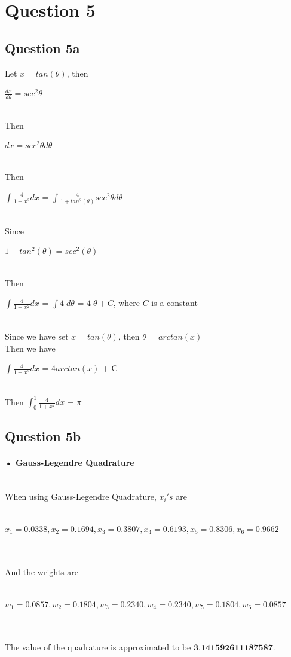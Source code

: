 \documentclass[11pt]{article} %
\begin{document}
\section{Question 5}
\subsection{Question 5a}
Let $x = tan(\theta)$, then\\
\centerline{$\frac{dx}{d\theta} = sec^{2}\theta$}\\
Then\\
\centerline{$dx = sec^{2}\theta d\theta$}\\
Then\\
\centerline{$\int\frac{4}{1+x^2}dx$ = $\int\frac{4}{1+tan^2(\theta)}sec^{2}\theta d\theta$}\\
Since\\
\centerline{$1+tan^2(\theta) = sec^{2}(\theta)$}\\
Then\\
\centerline{$\int\frac{4}{1+x^2}dx$ = $\int 4\;d\theta$ = $4\;\theta + C$, where $C$ is a constant}\\
Since we have set $x = tan(\theta)$, then $\theta$ = $arctan(x)$\\
Then we have \\
\centerline{$\int\frac{4}{1+x^2}dx$ = $4arctan(x)$ + C}\\
Then $\int_{0}^{1}\frac{4}{1+x^2}dx$ = $\pi$
\subsection{Question 5b}
\paragraph{• Gauss-Legendre Quadrature}\mbox{}\\
When using Gauss-Legendre Quadrature, $x_{i}'s$ are\\\\
\centerline{$x_{1} = 0.0338,x_{2}= 0.1694,x_{3}= 0.3807,x_{4}=0.6193,x_{5}=0.8306,x_{6}= 0.9662$}\\\\
And the wrights are\\\\
\centerline{$w_{1}=0.0857,w_{2}=0.1804,w_{3}=0.2340,w_{4}=0.2340,w_{5}=0.1804,w_{6}=0.0857$}\\\\
The value of the quadrature is approximated to be $\textbf{3.141592611187587}$.
\end{document}
